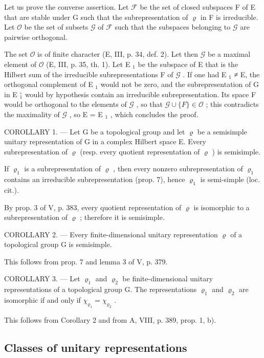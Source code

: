 Let us prove the converse assertion. Let \(\mathcal{F}\) be the set of closed subspaces F of E that are stable under G such that the subrepresentation of \(\varrho\) in F is irreducible. Let \(\mathcal{O}\) be the set of subsets \(\mathcal{G}\) of \(\mathcal{F}\) such that the subspaces belonging to \(\mathcal{G}\) are pairwise orthogonal.

The set \(\mathcal{O}\) is of finite character (E, III, p. 34, def. 2). Let then \(\mathcal{G}\) be a maximal element of \(\mathcal{O}\) (E, III, p. 35, th. 1). Let E \(_1\) be the subspace of E that is the Hilbert sum of the irreducible subrepresentations F of \(\mathcal{G}\) . If one had E \(_1\) ≠ E, the orthogonal complement of E \(_1\) would not be zero, and the subrepresentation of G in E \(_1^{\circ}\) would by hypothesis contain an irreducible subrepresentation. Its space F would be orthogonal to the elements of \(\mathcal{G}\) , so that \(\mathcal{G} \cup \{F\} \in \mathcal{O}\) ; this contradicts the maximality of \(\mathcal{G}\) , so E = E \(_1\) , which concludes the proof.

COROLLARY 1. --- Let G be a topological group and let \(\varrho\) be a semisimple unitary representation of G in a complex Hilbert space E. Every subrepresentation of \(\varrho\) (resp. every quotient representation of \(\varrho\) ) is semisimple.

If \(\varrho_{1}\) is a subrepresentation of \(\varrho\) , then every nonzero subrepresentation of \(\varrho_{1}\) contains an irreducible subrepresentation (prop. 7), hence \(\varrho_{1}\) is semi-simple (loc. cit.).

By prop. 3 of V, p. 383, every quotient representation of \(\varrho\) is isomorphic to a subrepresentation of \(\varrho\) ; therefore it is semisimple.

COROLLARY 2. --- Every finite-dimensional unitary representation \(\varrho\) of a topological group G is semisimple.

This follows from prop. 7 and lemma 3 of V, p. 379.

COROLLARY 3. --- Let \(\varrho_{1}\) and \(\varrho_{2}\) be finite-dimensional unitary representations of a topological group G. The representations \(\varrho_{1}\) and \(\varrho_{2}\) are isomorphic if and only if \(\chi_{\varrho_{1}} = \chi_{\varrho_{2}}\) .

This follows from Corollary 2 and from A, VIII, p. 389, prop. 1, b).

\subsection{Classes of unitary representations}

